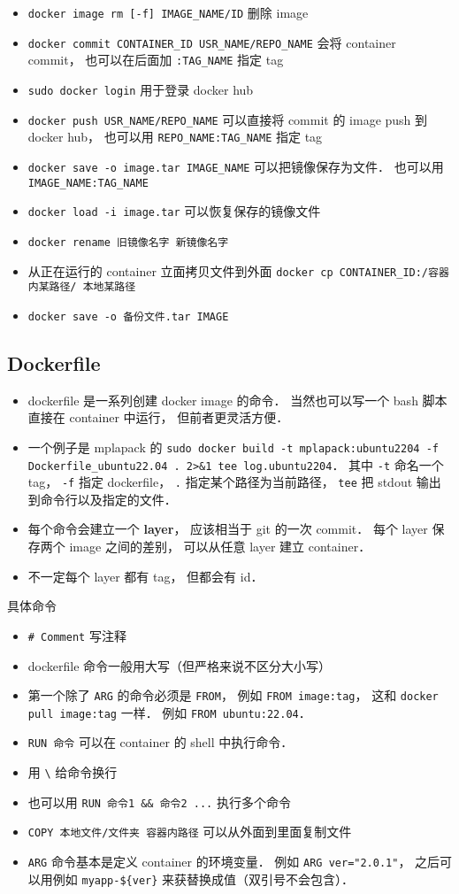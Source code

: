 \begin{itemize}
\item \verb`docker image rm [-f] IMAGE_NAME/ID` 删除 image
\item \verb`docker commit CONTAINER_ID USR_NAME/REPO_NAME` 会将 container commit， 也可以在后面加 \verb`:TAG_NAME` 指定 tag
\item \verb`sudo docker login` 用于登录 docker hub
\item \verb`docker push USR_NAME/REPO_NAME` 可以直接将 commit 的 image push 到 docker hub， 也可以用 \verb`REPO_NAME:TAG_NAME` 指定 tag
\item \verb|docker save -o image.tar IMAGE_NAME| 可以把镜像保存为文件． 也可以用 \verb|IMAGE_NAME:TAG_NAME|
\item \verb|docker load -i image.tar| 可以恢复保存的镜像文件
\item \verb|docker rename 旧镜像名字 新镜像名字|
\item 从正在运行的 container 立面拷贝文件到外面 \verb|docker cp CONTAINER_ID:/容器内某路径/ 本地某路径|
\item \verb|docker save -o 备份文件.tar IMAGE|
\end{itemize}

\subsection{Dockerfile}
\begin{itemize}
\item dockerfile 是一系列创建 docker image 的命令． 当然也可以写一个 bash 脚本直接在 container 中运行， 但前者更灵活方便．
\item 一个例子是 mplapack 的 \verb|sudo docker build -t mplapack:ubuntu2204 -f Dockerfile_ubuntu22.04 . 2>&1 tee log.ubuntu2204|． 其中 \verb|-t| 命名一个 tag， \verb|-f| 指定 dockerfile， \verb|.| 指定某个路径为当前路径， \verb|tee| 把 stdout 输出到命令行以及指定的文件．
\item 每个命令会建立一个 \textbf{layer}， 应该相当于 git 的一次 commit． 每个 layer 保存两个 image 之间的差别， 可以从任意 layer 建立 container．
\item 不一定每个 layer 都有 tag， 但都会有 id．
\end{itemize}

具体命令
\begin{itemize}
\item \verb|# Comment| 写注释
\item dockerfile 命令一般用大写（但严格来说不区分大小写）
\item 第一个除了 \verb|ARG| 的命令必须是 \verb|FROM|， 例如 \verb|FROM image:tag|， 这和 \verb|docker pull image:tag| 一样． 例如 \verb|FROM ubuntu:22.04|．
\item \verb|RUN 命令| 可以在 container 的 shell 中执行命令．
\item 用 \verb|\| 给命令换行
\item 也可以用 \verb|RUN 命令1 && 命令2 ...| 执行多个命令
\item \verb|COPY 本地文件/文件夹 容器内路径| 可以从外面到里面复制文件
\item \verb|ARG| 命令基本是定义 container 的环境变量． 例如 \verb|ARG ver="2.0.1"|， 之后可以用例如 \verb|myapp-${ver}| 来获替换成值（双引号不会包含）．
\end{itemize}


